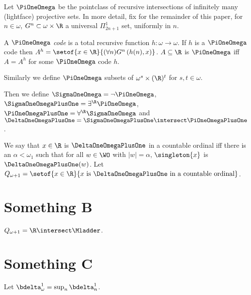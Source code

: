 \documentclass[oneside,12pt]{amsart}
\begin{document}
\begin{definition}
Let $\PiOneOmega$ be the pointclass of recursive intersections of infinitely many (lightface) projective sets.
In more detail, fix for the remainder of this paper, for $n\in\omega$, $G^n\subset\omega\times\R$
a universal $\Pi^1_{2n+1}$ set, uniformly in $n$.

A $\PiOneOmega$ \emph{code} is a total recursive function $h:\omega\to\omega$. If $h$ is a $\PiOneOmega$ code then
$A^h=\setof{x\in\R}{(\forall n) G^n\left(h(n),x\right)}$. $A\subseteq\R$ is $\PiOneOmega$ iff
$A=A^h$ for some $\PiOneOmega$ code $h$.

Similarly we define $\PiOneOmega$ subsets of $\omega^s\times(\R)^t$ for $s,t\in\omega$.

Then we define $\SigmaOneOmega = \neg\PiOneOmega$, $\SigmaOneOmegaPlusOne=\exists^{\R}\PiOneOmega$,
$\PiOneOmegaPlusOne = \forall^{\R}\SigmaOneOmega$ and
$\DeltaOneOmegaPlusOne = \SigmaOneOmegaPlusOne \intersect \PiOneOmegaPlusOne$.
\end{definition}

\begin{definition}
We say that $x\in\R$ is $\DeltaOneOmegaPlusOne$ in a countable ordinal iff there is an $\alpha<\omega_1$ such
that for all $w\in\WO$ with $|w|=\alpha$, $\singleton{x}$ is $\DeltaOneOmegaPlusOne(w)$.
Let $Q_{\omega+1} = \setof{x\in\R}{x\text{ is }\DeltaOneOmegaPlusOne\text{ in a countable ordinal}}$.
\end{definition}

\section{Something B}
\label{section:somethingb}
\begin{theorem}
$Q_{\omega+1} = \R \intersect \Mladder$.
\end{theorem}

\section{Something C}
\label{section:somethingac}

Let $\bdelta^1_{\omega} = \sup_n \bdelta^1_n$.
\end{document}
